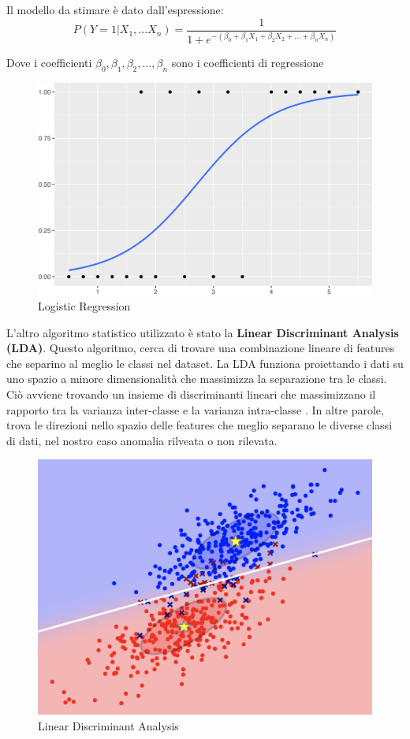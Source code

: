 Il modello da stimare \`e dato dall'espressione\cite{lr}:
\begin{equation}
P(Y=1 | X_1,...X_n) = \frac{1}{1 + e^{-(\beta_0 + \beta_1 X_1 + \beta_2 X_2 + \ldots + \beta_n X_n)}}
\end{equation}

Dove i coefficienti $\beta_0, \beta_1, \beta_2, \ldots, \beta_n$ sono i coefficienti di regressione

\begin{figure}[H]
    \centering
    \includegraphics[width=0.6\linewidth]{Logistic Regression.png}
    \caption{Logistic Regression}
    \label{fig:logistic_regression}
\end{figure}

\vspace{1.5cm}

L'altro algoritmo statistico utilizzato \`e stato la \textbf{Linear Discriminant Analysis (LDA)}. Questo algoritmo, cerca di trovare una combinazione lineare di features che separino al meglio le classi nel dataset. La LDA funziona proiettando i dati su uno spazio a minore  dimensionalit\`a che massimizza la separazione tra le classi. Ci\`o avviene trovando un insieme di discriminanti lineari che massimizzano il rapporto tra la varianza inter-classe e la varianza intra-classe \cite{lda}. In altre parole, trova le direzioni nello spazio delle features che meglio separano le diverse classi di dati, nel nostro caso anomalia rilveata o non rilevata.

\begin{figure}[H]
    \centering
    \includegraphics[width=0.5\linewidth]{LDA2.png}
    \caption{Linear Discriminant Analysis}
    \label{fig:lda}
\end{figure}

